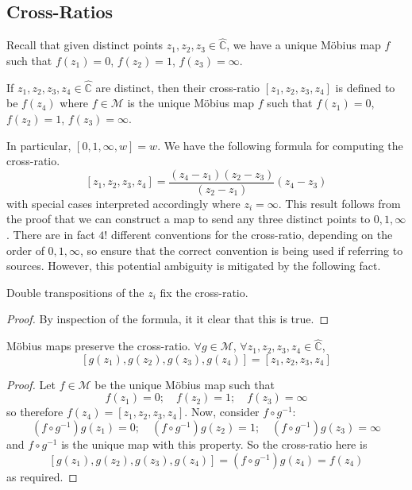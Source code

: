 \subsection{Cross-Ratios}
Recall that given distinct points \(z_1, z_2, z_3 \in \hat{\mathbb C}\), we have a unique M\"obius map \(f\) such that \(f(z_1) = 0\), \(f(z_2) = 1\), \(f(z_3) = \infty\).
\begin{definition}
	If \(z_1, z_2, z_3, z_4 \in \hat{\mathbb C}\) are distinct, then their cross-ratio \([z_1, z_2, z_3, z_4]\) is defined to be \(f(z_4)\) where \(f \in \mathcal M\) is the unique M\"obius map \(f\) such that \(f(z_1) = 0\), \(f(z_2) = 1\), \(f(z_3) = \infty\).
\end{definition}
In particular, \([0, 1, \infty, w] = w\).
We have the following formula for computing the cross-ratio.
\[
	[z_1, z_2, z_3, z_4] = \frac{(z_4 - z_1)(z_2 - z_3)}{(z_2 - z_1)}(z_4 - z_3)
\]
with special cases interpreted accordingly where \(z_i = \infty\).
This result follows from the proof that we can construct a map to send any three distinct points to \(0, 1, \infty\).
There are in fact \(4! \) different conventions for the cross-ratio, depending on the order of \(0, 1, \infty\), so ensure that the correct convention is being used if referring to sources.
However, this potential ambiguity is mitigated by the following fact.
\begin{proposition}
	Double transpositions of the \(z_i\) fix the cross-ratio.
\end{proposition}
\begin{proof}
	By inspection of the formula, it it clear that this is true.
\end{proof}
\begin{theorem}
	M\"obius maps preserve the cross-ratio.
	\(\forall g \in \mathcal M\), \(\forall z_1, z_2, z_3, z_4 \in \hat{\mathbb C}\),
	\[
		[g(z_1), g(z_2), g(z_3), g(z_4)] = [z_1, z_2, z_3, z_4]
	\]
\end{theorem}
\begin{proof}
	Let \(f \in \mathcal M\) be the unique M\"obius map such that
	\[
		f(z_1) = 0;\quad f(z_2) = 1;\quad f(z_3) = \infty
	\]
	so therefore \(f(z_4) = [z_1, z_2, z_3, z_4]\).
	Now, consider \(f \circ g^{-1}\):
	\[
		(f \circ g^{-1})g(z_1) = 0;\quad (f \circ g^{-1})g(z_2) = 1;\quad (f \circ g^{-1})g(z_3) = \infty
	\]
	and \(f \circ g^{-1}\) is the unique map with this property.
	So the cross-ratio here is
	\[
		[g(z_1), g(z_2), g(z_3), g(z_4)] = (f \circ g^{-1})g(z_4) = f(z_4)
	\]
	as required.
\end{proof}
